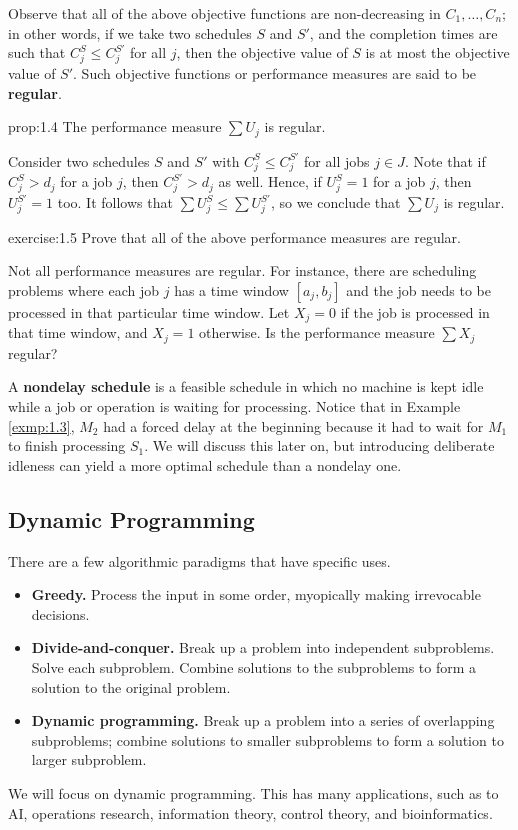 Observe that all of the above objective functions are non-decreasing in 
$C_1, \dots, C_n$; in other words, if we take two schedules $S$ and $S'$, 
and the completion times are such that $C_j^S \leq C_j^{S'}$ for all 
$j$, then the objective value of $S$ is at most the objective value of $S'$. 
Such objective functions or performance measures are said to be {\bf regular}.

\begin{prop}{prop:1.4}
    The performance measure $\sum U_j$ is regular. 
\end{prop}
\begin{pf}
    Consider two schedules $S$ and $S'$ with $C_j^S \leq C_j^{S'}$ for all 
    jobs $j \in J$. Note that if $C_j^S > d_j$ for a job $j$, then 
    $C_j^{S'} > d_j$ as well. Hence, if $U_j^S = 1$ for a job $j$, then 
    $U_j^{S'} = 1$ too. It follows that $\sum U_j^S \leq \sum U_j^{S'}$, 
    so we conclude that $\sum U_j$ is regular. 
\end{pf}

\begin{exercise}{exercise:1.5}
    Prove that all of the above performance measures are regular.
\end{exercise}

Not all performance measures are regular. For instance, there are scheduling 
problems where each job $j$ has a time window $[a_j, b_j]$ and the 
job needs to be processed in that particular time window. Let $X_j = 0$ if the 
job is processed in that time window, and $X_j = 1$ otherwise. 
Is the performance measure $\sum X_j$ regular?

A {\bf nondelay schedule} is a feasible schedule in which no machine is kept 
idle while a job or operation is waiting for processing. Notice that in 
Example \ref{exmp:1.3}, $M_2$ had a forced delay at the beginning because 
it had to wait for $M_1$ to finish processing $S_1$. We will discuss this 
later on, but introducing deliberate idleness can yield a more optimal 
schedule than a nondelay one. 

\subsection{Dynamic Programming}\label{subsec:1.3}
There are a few algorithmic paradigms that have specific uses.
\begin{itemize}
    \item {\bf Greedy.} Process the input in some order, myopically making 
    irrevocable decisions.
    \item {\bf Divide-and-conquer.} Break up a problem into independent 
    subproblems. Solve each subproblem. Combine solutions to the subproblems to 
    form a solution to the original problem.
    \item {\bf Dynamic programming.} Break up a problem into a series of 
    overlapping subproblems; combine solutions to smaller subproblems to 
    form a solution to larger subproblem.
\end{itemize}
We will focus on dynamic programming. This has many applications, such as 
to AI, operations research, information theory, control theory, and 
bioinformatics. 

